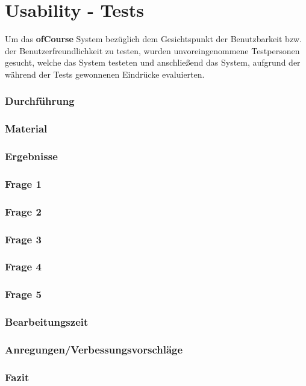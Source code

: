\chapter{Usability - Tests}
Um das \textbf{ofCourse} System bezüglich dem Gesichtspunkt der Benutzbarkeit bzw. der Benutzerfreundlichkeit zu testen,
wurden unvoreingenommene Testpersonen gesucht, welche das System testeten und anschließend das System, aufgrund der
während der Tests gewonnenen Eindrücke evaluierten.

\subsection{Durchführung}

\subsection{Material}

\subsection{Ergebnisse}

\subsection{Frage 1}

\subsection{Frage 2}

\subsection{Frage 3}

\subsection{Frage 4}

\subsection{Frage 5}

\subsection{Bearbeitungszeit}

\subsection{Anregungen/Verbessungsvorschläge}

\subsection{Fazit}